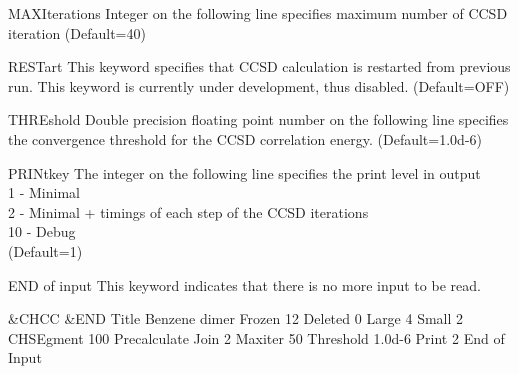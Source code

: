 \begin{keywordlist}
\item[MAXIterations]
Integer on the following line specifies maximum number of CCSD iteration
(Default=40)
\item[RESTart]
This keyword specifies that CCSD calculation is restarted from previous
run. This keyword is currently under development,
thus disabled. (Default=OFF)
\item[THREshold]
Double precision floating point number on the following line specifies
the convergence threshold for the CCSD correlation energy.
(Default=1.0d-6)
\item[PRINtkey]
The integer on the following line specifies the print level in output \\
1  - Minimal \\
2  - Minimal + timings of each step of the CCSD iterations \\
10 - Debug \\
(Default=1)
\item[END of input]
This keyword indicates that there is no more input
to be read.
\end{keywordlist}

\begin{inputlisting}
 &CHCC &END
Title
Benzene dimer
Frozen
12
Deleted
0
Large
4
Small
2
CHSEgment
100
Precalculate
Join
2
Maxiter
50
Threshold
1.0d-6
Print
2
End of Input
\end{inputlisting}

